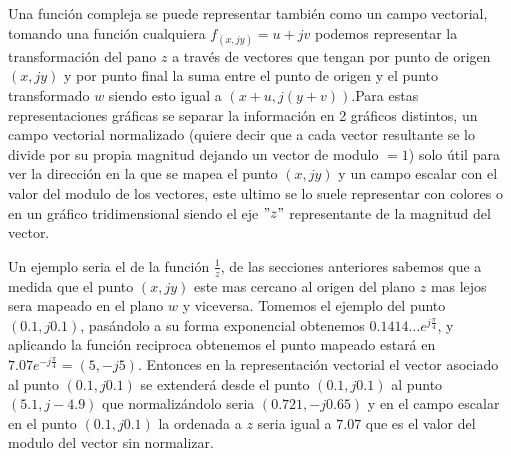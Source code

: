 Una función compleja se puede representar también como un campo vectorial, tomando una función cualquiera $f_{(x,jy)}=u+jv$ podemos representar la transformación del pano $z$ a través de vectores que tengan por punto de origen $(x,jy)$ y por punto final la suma entre el punto de origen y el punto transformado $w$ siendo esto igual a $(x+u,j(y+v))$.Para estas representaciones gráficas se separar la información en 2 gráficos distintos, un campo vectorial normalizado (quiere decir que a cada vector resultante se lo divide por su propia magnitud dejando un vector de modulo $=1$) solo útil para ver la dirección en la que se mapea el punto $(x,jy)$ y un campo escalar con el valor del modulo de los vectores, este ultimo se lo suele representar con colores o en un gráfico tridimensional siendo el eje $"z"$ representante de la magnitud del vector.

Un ejemplo seria el de la función $\frac{1}{z}$, de las secciones anteriores sabemos que a medida que el punto $(x,jy)$ este mas cercano al origen del plano $z$ mas lejos sera mapeado en el plano $w$ y viceversa. Tomemos el ejemplo del punto $(0.1,j0.1)$, pasándolo a su forma exponencial obtenemos $0.1414...e^{j\frac{\pi}{4}}$, y aplicando la función reciproca obtenemos el punto mapeado estará en $7.07e^{-j\frac{\pi}{4}}=(5,-j5)$. Entonces en la representación vectorial el vector asociado al punto $(0.1,j0.1)$ se extenderá desde el punto $(0.1,j0.1)$ al punto $(5.1,j-4.9)$ que normalizándolo seria $(0.721,-j0.65)$ y en el campo escalar en el punto $(0.1,j0.1)$ la ordenada a $z$ seria igual a $7.07$ que es el valor del modulo del vector sin normalizar.


